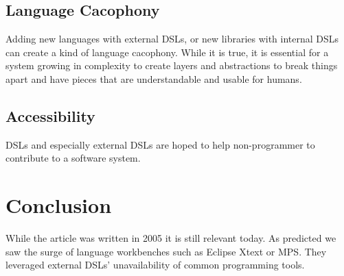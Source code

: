 \documentclass{proc}
\begin{document}
\subsection{Language Cacophony}
Adding new languages with external DSLs, or new libraries with internal DSLs can
create a kind of language cacophony. While it is true, it is essential for a
system growing in complexity to create layers and abstractions to break things
apart and have pieces that are understandable and usable for humans.

\subsection{Accessibility}
DSLs and especially external DSLs are hoped to help non-programmer to contribute
to a software system.


\section{Conclusion}
\label{conclusion}
While the article was written in 2005 it is still relevant today. As predicted
we saw the surge of language workbenches such as Eclipse Xtext or MPS\@. They
leveraged external DSLs' unavailability of common programming tools.
\end{document}
